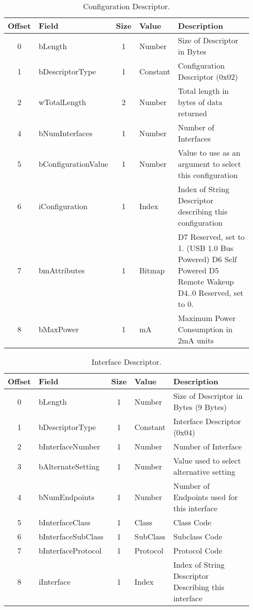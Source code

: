 \begin{appendices}
\begin{table}[h]
\centering
\label{tab:usb_configuration_descriptor}
\begin{tabular}{|c|l|c|l|p{8cm}|}
\hline
\textbf{Offset} & \textbf{Field} & \textbf{Size} & \textbf{Value} & \textbf{Description} \\ \hline
0 & bLength & 1 & Number & Size of Descriptor in Bytes \\ \hline
1 & bDescriptorType & 1 & Constant & Configuration Descriptor (0x02) \\ \hline
2 & wTotalLength & 2 & Number & Total length in bytes of data returned \\ \hline
4 & bNumInterfaces & 1 & Number & Number of Interfaces \\ \hline
5 & bConfigurationValue & 1 & Number & Value to use as an argument to select this configuration \\ \hline
6 & iConfiguration & 1 & Index & Index of String Descriptor describing this configuration \\ \hline
7 & bmAttributes & 1 & Bitmap & D7 Reserved, set to 1. (USB 1.0 Bus Powered) D6 Self Powered D5 Remote Wakeup D4..0 Reserved, set to 0. \\ \hline
8 & bMaxPower & 1 & mA & Maximum Power Consumption in 2mA units \\ \hline
\end{tabular}
\caption{Configuration Descriptor.}
\end{table}

\begin{table}[h]
\centering
\label{tab:usb_interface_descriptor}
\begin{tabular}{|c|l|c|l|p{6cm}|}
\hline
\textbf{Offset} & \textbf{Field} & \textbf{Size} & \textbf{Value} & \textbf{Description} \\ \hline
0 & bLength & 1 & Number & Size of Descriptor in Bytes (9 Bytes) \\ \hline
1 & bDescriptorType & 1 & Constant & Interface Descriptor (0x04) \\ \hline
2 & bInterfaceNumber & 1 & Number & Number of Interface \\ \hline
3 & bAlternateSetting & 1 & Number & Value used to select alternative setting \\ \hline
4 & bNumEndpoints & 1 & Number & Number of Endpoints used for this interface \\ \hline
5 & bInterfaceClass & 1 & Class & Class Code \\ \hline
6 & bInterfaceSubClass & 1 & SubClass & Subclass Code \\ \hline
7 & bInterfaceProtocol & 1 & Protocol & Protocol Code \\ \hline
8 & iInterface & 1 & Index & Index of String Descriptor Describing this interface \\ \hline
\end{tabular}
\caption{Interface Descriptor.}
\end{table}


\end{appendices}
